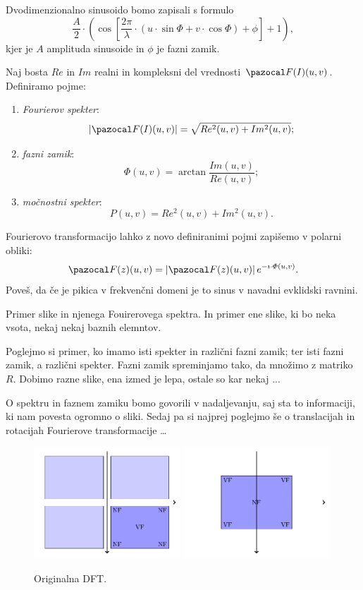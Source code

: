 Dvodimenzionalno sinusoido bomo zapisali s formulo
$$\frac{A}{2} \cdot \left(\cos\left[\frac{2\pi}{\lambda} \cdot (u \cdot \sin \Phi + v \cdot \cos \Phi) + \phi\right] + 1\right),$$
kjer je $A$ amplituda sinusoide in $\phi$ je fazni zamik.
%
\begin{definicija}
Naj bosta $Re$ in $Im$ realni in kompleksni del vrednosti $\F(I)(u, v)$. Definiramo pojme: 
%
\begin{enumerate}
\item \emph{Fourierov spekter}:
$$\abs{\F(I)(u, v)} = \sqrt{Re^2(u, v) + Im^2(u, v)};$$
\item \emph{fazni zamik}:
$$\varPhi(u, v) = \arctan\frac{Im(u, v)}{Re(u, v)};$$
\item \emph{močnostni spekter}:
$$P(u, v) = Re^2(u, v) + Im^2(u, v).$$
\end{enumerate}
\end{definicija}
%
Fourierovo transformacijo lahko z novo definiranimi pojmi zapišemo v polarni obliki:
$$\F(z)(u, v) = \abs{\F(z)(u, v)} e^{-\imath \cdot \varPhi(u, v)}.$$
%
Poveš, da če je pikica v frekvenčni domeni je to sinus v navadni evklidski ravnini.
%
\begin{primer}
Primer slike in njenega Fouirerovega spektra. In primer ene slike, ki bo neka vsota, nekaj nekaj baznih elemntov.
\end{primer}
%
\begin{primer}
Poglejmo si primer, ko imamo isti spekter in različni fazni zamik; ter isti fazni zamik, a različni spekter. Fazni zamik spreminjamo tako, da množimo z matriko $R$. Dobimo razne slike, ena izmed je lepa, ostale so kar nekaj ...             
\end{primer}
%
O spektru in faznem zamiku bomo govorili v nadaljevanju, saj sta to informaciji, ki nam povesta ogromno o sliki. Sedaj pa si najprej poglejmo še o translacijah in rotacijah Fourierove transformacije \ldots

%
\begin{figure}[htbp]
  \centering
  \includegraphics[width=0.49\textwidth]{./slike-latex/DFToriginal}
  \includegraphics[width=0.49\textwidth]{./slike-latex/DFTpremaknjena}
  \caption{Originalna DFT.}
  \label{fig:DFToriginal}
\end{figure}
%
